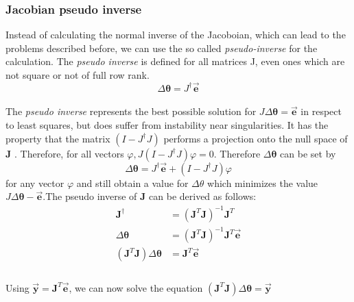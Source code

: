 \subsubsection{Jacobian pseudo inverse}
Instead of calculating the normal inverse of the Jacoboian, which can lead to the problems described before, we can use the so called \textit{pseudo-inverse}\cite{Dahmen.2008} for the calculation. The \textit{pseudo inverse} is defined for all matrices J, even ones
which are not square or not of full row rank.\\
\begin{equation}
\label{pseudo inv def}
\Delta\pmb{\theta}=J^{\dagger}\vec{\pmb{e}}
\end{equation}
\\The \textit{pseudo inverse} represents the best possible solution for $ J\Delta\pmb{\theta}=\vec{\pmb{e}}$ in respect to least squares, but does suffer from instability near singularities. It has the property that the matrix $(I − J^{\dagger}J)$ performs a projection onto the null space of \textbf{J} . Therefore, for all vectors $\varphi, J(I −J^{\dagger}J)\varphi = 0$. Therefore $\Delta\pmb{\theta}$ can be set by
\begin{equation}
\Delta\pmb{\theta}=J^{\dagger}\vec{\pmb{e}}+(I-J^{\dagger}J)\varphi
\end{equation}
for any vector $\varphi$ and still obtain a value for $\Delta\theta$ which minimizes the value $ J\Delta\pmb{\theta} −\vec{\pmb{e}}$.The pseudo inverse of \textbf{J} can be derived as follows:\\
\begin{equation}
\begin{split}
\pmb{J}^{\dagger}&=(\pmb{J}^{T}\pmb{J})^{-1}\pmb{J}^{T}\\
\Delta\pmb{\theta}&=(\pmb{J}^{T}\pmb{J})^{-1}\pmb{J}^{T}\vec{\pmb{e}}\\
(\pmb{J}^{T}\pmb{J})\Delta\pmb{\theta}&=\pmb{J}^{T}\vec{\pmb{e}}\\
\end{split}
\end{equation}
\\Using $\vec{\pmb{y}}=\pmb{J}^{T}\vec{\pmb{e}}$, we can now solve the equation $(\pmb{J}^{T}\pmb{J})\Delta\pmb{\theta}=\vec{\pmb{y}}$

